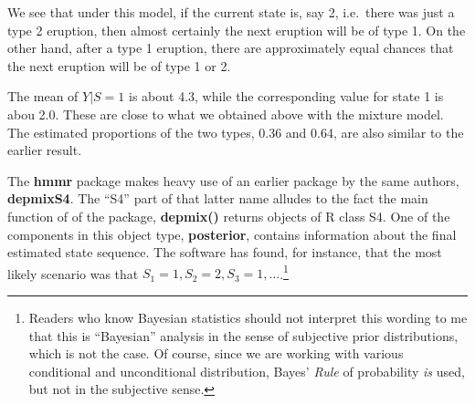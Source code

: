 \documentclass[11pt]{article}
\begin{document}
We see that under this model, if the current state is, say 2, i.e.\
there was just a type 2 eruption, then almost certainly the next
eruption will be of type 1.  On the other hand, after a type 1 eruption,
there are approximately equal chances that the next eruption will be of
type 1 or 2.

The mean of $Y | S = 1$ is about 4.3, while the corresponding value for
state 1 is abou 2.0.  These are close to what we obtained above with the
mixture model.  The estimated proportions of the two types, 0.36 and
0.64, are also similar to the earlier result.

The \textbf{hmmr} package makes heavy use of an earlier package by the
same authors, \textbf{depmixS4}.  The ``S4'' part of that latter name
alludes to the fact the main function of of the package, \textbf{depmix()}
returns objects of R class S4.  One of the components in this object
type, \textbf{posterior}, contains information about the final estimated
state sequence.  The software has found, for instance, that the most
likely scenario was that $S_1 = 1, S_2 = 2, S_3 = 1,
...$.\footnote{Readers who know Bayesian statistics should not interpret
this wording to me that this is ``Bayesian'' analysis in the sense of
subjective prior distributions, which is not the case.  Of course, since
we are working with various conditional and unconditional distribution,
Bayes' \textit{Rule} of probability \textit{is} used, but not in the
subjective sense.}



% 
% 
% 
% 
% 

% 
% 
\end{document}
